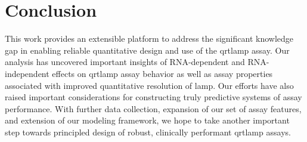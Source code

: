 \documentclass[../thesis.tex]{subfiles}
\begin{document}



%
%






\section{Conclusion}

This work provides an extensible platform to address the significant knowledge gap in enabling reliable quantitative design and use of the \gls{qrtlamp} assay. 
Our analysis has uncovered important insights of RNA-dependent and RNA-independent effects on \gls{qrtlamp} assay behavior as well as assay properties associated with improved quantitative resolution of \gls{lamp}. Our efforts have also raised important considerations for constructing truly predictive systems of assay performance. With further data collection, expansion of our set of assay features, and extension of our modeling framework, we hope to take another important step towards principled design of robust, clinically performant \gls{qrtlamp} assays. 





\dobib %
\end{document}

